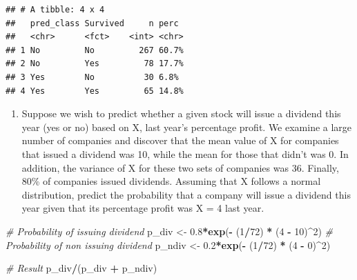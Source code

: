 \documentclass[]{article}
\newenvironment{Shaded}{\begin{snugshade}}{\end{snugshade}}
\newcommand{\CommentTok}[1]{\textcolor[rgb]{0.56,0.35,0.01}{\textit{#1}}}
\newcommand{\DecValTok}[1]{\textcolor[rgb]{0.00,0.00,0.81}{#1}}
\newcommand{\FloatTok}[1]{\textcolor[rgb]{0.00,0.00,0.81}{#1}}
\newcommand{\KeywordTok}[1]{\textcolor[rgb]{0.13,0.29,0.53}{\textbf{#1}}}
\newcommand{\NormalTok}[1]{#1}
\newcommand{\OperatorTok}[1]{\textcolor[rgb]{0.81,0.36,0.00}{\textbf{#1}}}
\newcommand{\StringTok}[1]{\textcolor[rgb]{0.31,0.60,0.02}{#1}}
\providecommand{\tightlist}{%
  \setlength{\itemsep}{0pt}\setlength{\parskip}{0pt}}
\begin{document}
\begin{verbatim}
## # A tibble: 4 x 4
##   pred_class Survived     n perc 
##   <chr>      <fct>    <int> <chr>
## 1 No         No         267 60.7%
## 2 No         Yes         78 17.7%
## 3 Yes        No          30 6.8% 
## 4 Yes        Yes         65 14.8%
\end{verbatim}

\begin{Shaded}
\end{Shaded}

\begin{enumerate}
\def\labelenumi{\arabic{enumi}.}
\setcounter{enumi}{1}
\tightlist
\item
  Suppose we wish to predict whether a given stock will issue a dividend
  this year (yes or no) based on X, last year's percentage profit. We
  examine a large number of companies and discover that the mean value
  of X for companies that issued a dividend was 10, while the mean for
  those that didn't was 0. In addition, the variance of X for these two
  sets of companies was 36. Finally, 80\% of companies issued dividends.
  Assuming that X follows a normal distribution, predict the probability
  that a company will issue a dividend this year given that its
  percentage profit was X = 4 last year.
\end{enumerate}

\begin{Shaded}
\begin{Highlighting}[]
\CommentTok{# Probability of issuing dividend }
\NormalTok{p_div <-}\StringTok{ }\FloatTok{0.8}\OperatorTok{*}\KeywordTok{exp}\NormalTok{(}\OperatorTok{-}\StringTok{ }\NormalTok{(}\DecValTok{1}\OperatorTok{/}\DecValTok{72}\NormalTok{) }\OperatorTok{*}\StringTok{ }\NormalTok{(}\DecValTok{4} \OperatorTok{-}\StringTok{ }\DecValTok{10}\NormalTok{)}\OperatorTok{^}\DecValTok{2}\NormalTok{)}
\CommentTok{# Probability of non issuing dividend }
\NormalTok{p_ndiv <-}\StringTok{ }\FloatTok{0.2}\OperatorTok{*}\KeywordTok{exp}\NormalTok{(}\OperatorTok{-}\StringTok{ }\NormalTok{(}\DecValTok{1}\OperatorTok{/}\DecValTok{72}\NormalTok{) }\OperatorTok{*}\StringTok{ }\NormalTok{(}\DecValTok{4} \OperatorTok{-}\StringTok{ }\DecValTok{0}\NormalTok{)}\OperatorTok{^}\DecValTok{2}\NormalTok{)}

\CommentTok{# Result}
\NormalTok{p_div}\OperatorTok{/}\NormalTok{(p_div }\OperatorTok{+}\StringTok{ }\NormalTok{p_ndiv)}
\end{Highlighting}
\end{Shaded}
\end{document}
